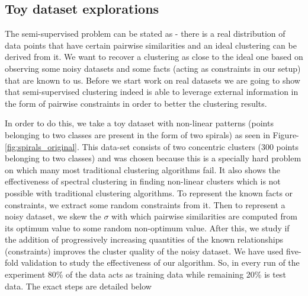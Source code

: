 \subsection{Toy dataset explorations} \label{chap2:sec:spirals_dataset}
The semi-supervised problem can be stated as - there is a real distribution of data points that have certain pairwise similarities and an ideal clustering can be derived from it. 
We want to recover a clustering as close to the ideal one based on observing some noisy datasets and some facts (acting as constraints in our setup) that are known to us. Before we start work on real datasets 
we are going to show that semi-supervised clustering indeed is able to leverage external information in the form of pairwise constraints in order to better the clustering results. 

In order to do this, we take a toy dataset with non-linear patterns (points belonging to two classes are present in the form of two spirals) as seen in Figure-\ref{fig:spirals_original}. This data-set consists of two concentric clusters (300 points belonging to two classes) and was chosen because this is a specially 
hard problem on which many most traditional clustering algorithms fail. It also shows the effectiveness of spectral clustering in finding non-linear clusters which is not possible with 
traditional clustering algorithms. To represent the known facts or constraints, we extract some random constraints from it. Then to represent a noisy dataset, we skew the $\sigma$ with which pairwise similarities are computed from its optimum value to some random non-optimum value. After this, we study if the addition of progressively increasing quantities of the known relationships (constraints) improves the cluster quality of the noisy dataset.
We have used five-fold validation to study the effectiveness of our algorithm. So, in every run of the experiment 80\% of the data acts as training data 
while remaining 20\% is test data. The exact steps are detailed below 

